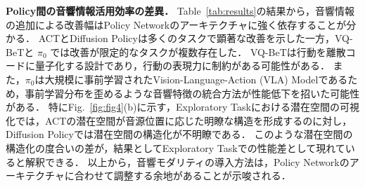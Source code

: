 \documentclass{article}
\begin{document}
	\textbf{Policy間の音響情報活用効率の差異．}
	Table~\ref{tab:results}の結果から，音響情報の追加による改善幅はPolicy Networkのアーキテクチャに強く依存することが分かる．
	ACTとDiffusion Policyは多くのタスクで顕著な改善を示した一方，VQ-BeTと $\pi_0$ では改善が限定的なタスクが複数存在した．
	VQ-BeTは行動を離散コードに量子化する設計であり，行動の表現力に制約がある可能性がある．
	また，$\pi_0$は大規模に事前学習されたVision-Language-Action (VLA) Modelであるため，事前学習分布を歪めるような音響特徴の統合方法が性能低下を招いた可能性がある．
	特にFig.~\ref{fig:fig4}(b)に示す，Exploratory Taskにおける潜在空間の可視化では，ACTの潜在空間が音源位置に応じた明瞭な構造を形成するのに対し，Diffusion Policyでは潜在空間の構造化が不明瞭である．
	このような潜在空間の構造化の度合いの差が，結果としてExploratory Taskでの性能差として現れていると解釈できる．
	以上から，音響モダリティの導入方法は，Policy Networkのアーキテクチャに合わせて調整する余地があることが示唆される．







\end{document}
